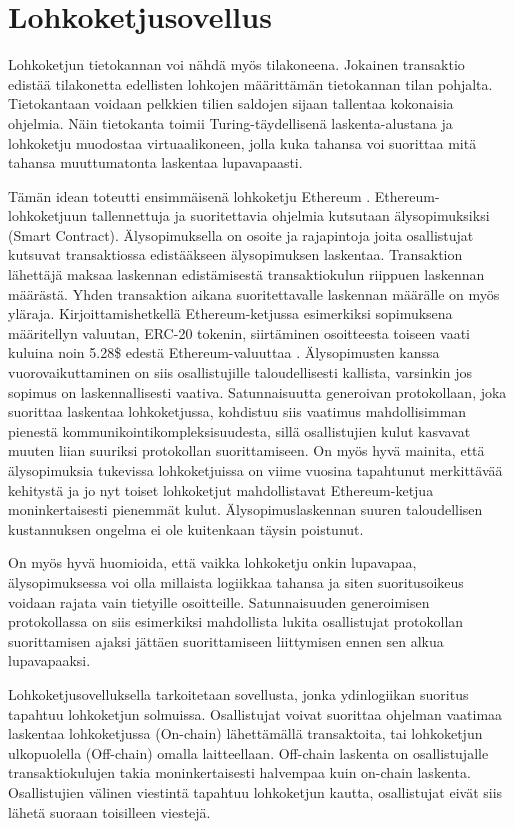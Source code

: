 \section{Lohkoketjusovellus}

Lohkoketjun tietokannan voi nähdä myös tilakoneena. Jokainen transaktio edistää tilakonetta edellisten lohkojen määrittämän tietokannan tilan pohjalta. Tietokantaan voidaan pelkkien tilien saldojen sijaan tallentaa kokonaisia ohjelmia. Näin tietokanta toimii Turing-täydellisenä laskenta-alustana ja lohkoketju muodostaa virtuaalikoneen, jolla kuka tahansa voi suorittaa mitä tahansa muuttumatonta laskentaa lupavapaasti.

Tämän idean toteutti ensimmäisenä lohkoketju Ethereum \cite{buterin_ethereum_2014}. Ethereum-lohkoketjuun tallennettuja ja suoritettavia ohjelmia kutsutaan älysopimuksiksi (Smart Contract). Älysopimuksella on osoite ja rajapintoja joita osallistujat kutsuvat transaktiossa edistääkseen älysopimuksen laskentaa. Transaktion lähettäjä maksaa laskennan edistämisestä transaktiokulun riippuen laskennan määrästä. Yhden transaktion aikana suoritettavalle laskennan määrälle on myös yläraja. Kirjoittamishetkellä Ethereum-ketjussa esimerkiksi sopimuksena määritellyn valuutan, ERC-20 tokenin, siirtäminen osoitteesta toiseen vaati kuluina noin 5.28\$ edestä Ethereum-valuuttaa \cite{etherscanio_ethereum_nodate}. Älysopimusten kanssa vuorovaikuttaminen on siis osallistujille taloudellisesti kallista, varsinkin jos sopimus on laskennallisesti vaativa. Satunnaisuutta generoivan protokollaan, joka suorittaa laskentaa lohkoketjussa, kohdistuu siis vaatimus mahdollisimman pienestä kommunikointikompleksisuudesta, sillä osallistujien kulut kasvavat muuten liian suuriksi protokollan suorittamiseen. On myös hyvä mainita, että älysopimuksia tukevissa lohkoketjuissa on viime vuosina tapahtunut merkittävää kehitystä ja jo nyt toiset lohkoketjut mahdollistavat Ethereum-ketjua moninkertaisesti pienemmät kulut. Älysopimuslaskennan suuren taloudellisen kustannuksen ongelma ei ole kuitenkaan täysin poistunut. 

On myös hyvä huomioida, että vaikka lohkoketju onkin lupavapaa, älysopimuksessa voi olla millaista logiikkaa tahansa ja siten suoritusoikeus voidaan rajata vain tietyille osoitteille. Satunnaisuuden generoimisen protokollassa on siis esimerkiksi mahdollista lukita osallistujat protokollan suorittamisen ajaksi jättäen suorittamiseen liittymisen ennen sen alkua lupavapaaksi.

Lohkoketjusovelluksella tarkoitetaan sovellusta, jonka ydinlogiikan suoritus tapahtuu lohkoketjun solmuissa. Osallistujat voivat suorittaa ohjelman vaatimaa laskentaa lohkoketjussa (On-chain) lähettämällä transaktoita, tai lohkoketjun ulkopuolella (Off-chain) omalla laitteellaan. Off-chain laskenta on osallistujalle transaktiokulujen takia moninkertaisesti halvempaa kuin on-chain laskenta. Osallistujien välinen viestintä tapahtuu lohkoketjun kautta, osallistujat eivät siis lähetä suoraan toisilleen viestejä.

